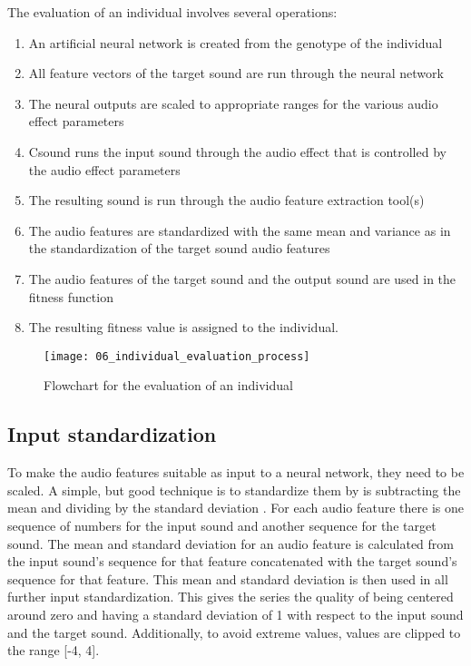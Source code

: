 The evaluation of an individual involves several operations:

\begin{enumerate}  
\item An artificial neural network is created from the genotype of the individual
\item All feature vectors of the target sound are run through the neural network
\item The neural outputs are scaled to appropriate ranges for the various audio effect parameters
\item Csound runs the input sound through the audio effect that is controlled by the audio effect parameters
\item The resulting sound is run through the audio feature extraction tool(s)
\item The audio features are standardized with the same mean and variance as in the standardization of the target sound audio features
\item The audio features of the target sound and the output sound are used in the fitness function
\item The resulting fitness value is assigned to the individual.
\end{enumerate}

\begin{figure}[h]
    \centering
    \texttt{[image: 06\_individual\_evaluation\_process]}
    \caption{Flowchart for the evaluation of an individual}
    \label{fig:individual_evaluation_process}
\end{figure}

\subsection{Input standardization}
To make the audio features suitable as input to a neural network, they need to be scaled. A simple, but good technique is to standardize them by is subtracting the mean and dividing by the standard deviation \citep{sarle2014}. For each audio feature there is one sequence of numbers for the input sound and another sequence for the target sound. The mean and standard deviation for an audio feature is calculated from the input sound’s sequence for that feature concatenated with the target sound’s sequence for that feature. This mean and standard deviation is then used in all further input standardization. This gives the series the quality of being centered around zero and having a standard deviation of 1 with respect to the input sound and the target sound. Additionally, to avoid extreme values, values are clipped to the range [-4, 4].

